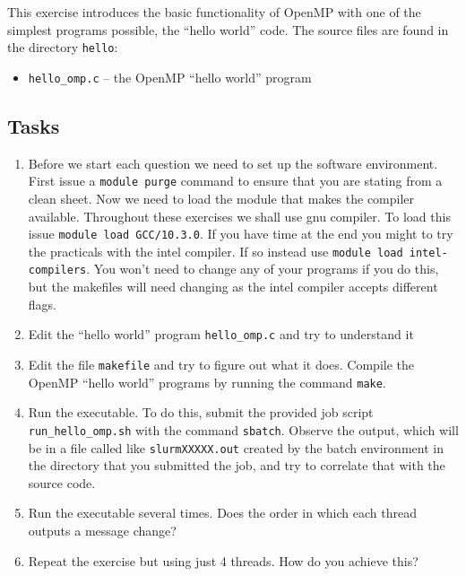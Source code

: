 \documentclass[a4paper, 12pt]{article}
\def \cc   {\tt }               %
\begin{document}
This exercise introduces the basic functionality of OpenMP with
one of the simplest programs possible, the ``hello world'' code.  The source
files are found in the directory {\cc hello}:
%
\begin{itemize}
  \item {\cc hello\_omp.c} -- the OpenMP ``hello world'' program 
\end{itemize}
%

\subsection*{Tasks}

\begin{enumerate}

  \item Before we start each question we need to set up the software 
    environment. First issue a {\cc module purge} command to ensure
    that you are stating from a clean sheet. Now we need to load
    the module that makes the compiler available.
    Throughout these exercises we shall use gnu compiler. To load this issue 
    {\cc module load GCC/10.3.0}. If you have time at the end
    you might to try the practicals with the intel
    compiler. If so instead use {\cc module load intel-compilers}.
    You won't need to change any of your programs if you do this, but the
    makefiles will need changing as the intel compiler accepts different flags.

  \item Edit the ``hello world'' program {\cc hello\_omp.c} and try to understand it

  \item Edit the file {\cc makefile} and try to figure out what it
    does.  Compile the OpenMP ``hello world'' programs by
    running the command {\cc make}.

  \item Run the executable.  To do this, submit the provided job
    script {\cc run\_hello\_omp.sh} with the command {\cc sbatch}.  Observe the
    output, which will be in a file called like {\cc slurmXXXXX.out} created by the batch environment in the directory that you submitted the job, and try to correlate that with the source code.

  \item Run the executable several times.  Does the order in which
    each thread outputs a message change?

  \item Repeat the exercise but using just 4 threads. How do you achieve this?

\end{enumerate}
\end{document}
